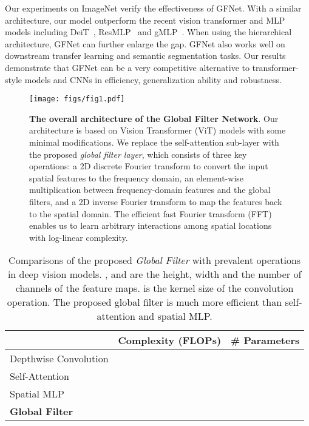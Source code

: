 \documentclass{article}
\numberwithin{equation}{section}
\newcommand{\gknet}{GFNet}
\begin{document}
Our experiments on ImageNet verify the effectiveness of {\gknet}. With a similar architecture, our model outperform the recent vision transformer and MLP models including DeiT~\cite{touvron2020deit}, ResMLP~\cite{touvron2021resmlp} and gMLP~\cite{liu2021pay}. When using the hierarchical architecture, {\gknet} can further enlarge the gap.  {\gknet} also works well on downstream transfer learning and semantic segmentation tasks.   Our results demonstrate that GFNet can be a very competitive alternative to transformer-style models and CNNs in efficiency, generalization ability and robustness.

\begin{figure}[t]
\centering
\texttt{[image: figs/fig1.pdf]}
\caption{\textbf{The overall architecture of the Global Filter Network}. Our architecture is based on Vision Transformer (ViT) models with some minimal modifications. We replace the self-attention sub-layer with the proposed \emph{global filter layer}, which consists of three key operations: a 2D discrete Fourier transform to convert the input spatial features to the frequency domain, an element-wise multiplication between frequency-domain features and the global filters, and a 2D inverse Fourier transform to map the features back to the spatial domain. The efficient fast Fourier transform (FFT) enables us to learn arbitrary interactions among spatial locations with log-linear complexity.  }
\label{fig:intro}
\end{figure}

\begin{table}[t]
\centering \small
{}
\begin{tabularx}{\textwidth}{g>{\Centering}p{6cm}>{\Centering}X}
\toprule
 & Complexity (FLOPs) & \# Parameters \\
\midrule
Depthwise Convolution &   &   \\
Self-Attention &  &   \\
Spatial MLP &  &  \\
\midrule
\textbf{Global Filter} &   &  \\
\bottomrule
\end{tabularx} \vspace{5pt}
\caption{Comparisons of the proposed \emph{Global Filter} with prevalent operations in deep vision models. ,  and  are the height, width and the number of channels of the feature maps.  is the kernel size of the convolution operation. The proposed global filter is much more efficient than self-attention and spatial MLP. }
\vspace{-10pt}
\label{tab:intro}
\end{table}  
\end{document}
